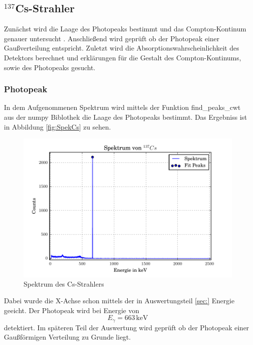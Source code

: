 \subsection{$^{137}$Cs-Strahler}
Zunächst wird die Laage des Photopeaks bestimmt und das Compton-Kontinum genauer untersucht . Anschließend wird geprüft ob der Photopeak einer Gaußverteilung entspricht. Zuletzt wird die Absorptionswahrscheinlichkeit des Detektors berechnet und erklärungen für die Gestalt des Compton-Kontinums, sowie des Photopeaks gesucht.
\subsubsection{Photopeak}
In dem Aufgenommenen Spektrum wird mittels der Funktion find\_peaks\_cwt aus der numpy Biblothek die Laage des Photopeaks bestimmt. Das Ergebniss ist in Abbildung \ref{fig:SpekCs} zu sehen. 
\begin{figure}
  \centering
  \includegraphics[width=\textwidth]{./build/SpektCS.pdf}
  \caption{Spektrum des Cs-Strahlers}
  \label{fig:SpekCS}
\end{figure}
Dabei wurde die X-Achse schon mittels der in Auswertungsteil \ref{sec:} Energie geeicht. Der Photopeak wird bei Energie von 
\begin{equation}
  E_\gamma = 663 \, \text{keV}
  \label{eqn:CsPhoto}
\end{equation} 
detektiert. Im späteren Teil der Auswertung wird geprüft ob der Photopeak einer Gaußförmigen Verteilung zu Grunde liegt.

